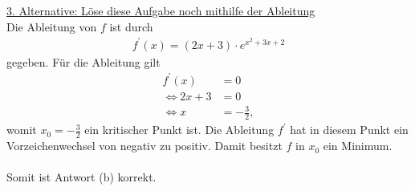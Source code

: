 \underline{3. Alternative: Löse diese Aufgabe noch mithilfe der Ableitung}\\
Die Ableitung von $f$ ist durch
\begin{align*}
f^\prime(x)=(2x +3) \cdot e^{x^2+3x+2}
\end{align*}
gegeben. Für die Ableitung gilt
\begin{align*}
f^\prime(x) &= 0\\ 
\Leftrightarrow
2x  +3 &= 0\\
\Leftrightarrow
x &= -\frac{3}{2},
\end{align*}
womit $x_0= -\frac{3}{2}$ ein kritischer Punkt ist.
Die Ableitung $f^\prime$ hat in diesem Punkt ein Vorzeichenwechsel von negativ zu positiv.
Damit besitzt $f$ in $x_0$ ein Minimum.
\\
\\
Somit ist Antwort (b) korrekt.